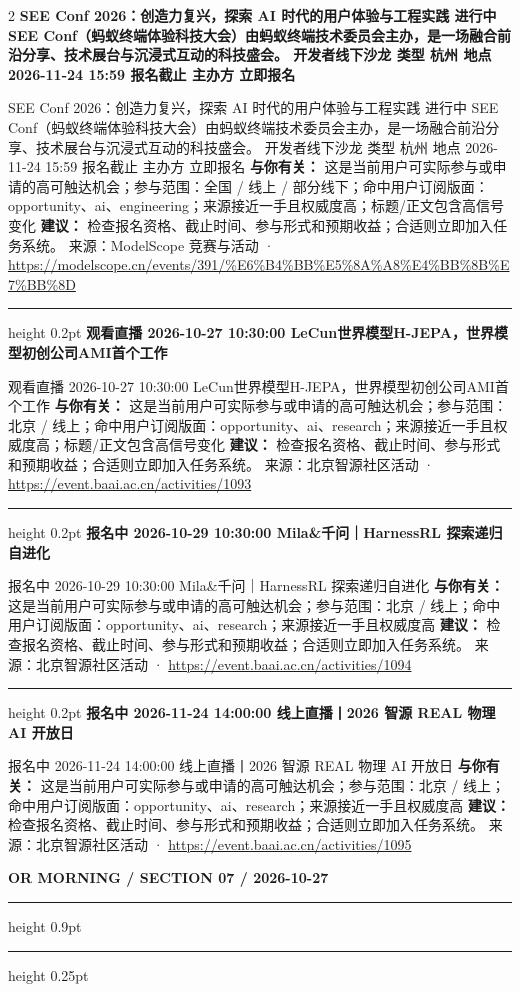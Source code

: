 \documentclass[10.5pt]{ctexart}
\begin{document}
\begin{multicols}{2}
{\large\bfseries SEE Conf 2026：创造力复兴，探索 AI 时代的用户体验与工程实践 进行中 SEE Conf（蚂蚁终端体验科技大会）由蚂蚁终端技术委员会主办，是一场融合前沿分享、技术展台与沉浸式互动的科技盛会。 开发者线下沙龙 类型 杭州 地点 2026-11-24 15:59 报名截止 主办方 立即报名}\par
SEE Conf 2026：创造力复兴，探索 AI 时代的用户体验与工程实践 进行中 SEE Conf（蚂蚁终端体验科技大会）由蚂蚁终端技术委员会主办，是一场融合前沿分享、技术展台与沉浸式互动的科技盛会。 开发者线下沙龙 类型 杭州 地点 2026-11-24 15:59 报名截止 主办方 立即报名
\textbf{与你有关：} 这是当前用户可实际参与或申请的高可触达机会；参与范围：全国 / 线上 / 部分线下；命中用户订阅版面：opportunity、ai、engineering；来源接近一手且权威度高；标题/正文包含高信号变化
\textbf{建议：} 检查报名资格、截止时间、参与形式和预期收益；合适则立即加入任务系统。
{\footnotesize\color{ormuted} 来源：ModelScope 竞赛与活动 · \url{https://modelscope.cn/events/391/%E6%B4%BB%E5%8A%A8%E4%BB%8B%E7%BB%8D}}
\vspace{2mm}
\hrule height 0.2pt
\vspace{2mm}
{\large\bfseries 观看直播 2026-10-27 10:30:00 LeCun世界模型H-JEPA，世界模型初创公司AMI首个工作}\par
观看直播 2026-10-27 10:30:00 LeCun世界模型H-JEPA，世界模型初创公司AMI首个工作
\textbf{与你有关：} 这是当前用户可实际参与或申请的高可触达机会；参与范围：北京 / 线上；命中用户订阅版面：opportunity、ai、research；来源接近一手且权威度高；标题/正文包含高信号变化
\textbf{建议：} 检查报名资格、截止时间、参与形式和预期收益；合适则立即加入任务系统。
{\footnotesize\color{ormuted} 来源：北京智源社区活动 · \url{https://event.baai.ac.cn/activities/1093}}
\vspace{2mm}
\hrule height 0.2pt
\vspace{2mm}
{\large\bfseries 报名中 2026-10-29 10:30:00 Mila\&千问｜HarnessRL 探索递归自进化}\par
报名中 2026-10-29 10:30:00 Mila\&千问｜HarnessRL 探索递归自进化
\textbf{与你有关：} 这是当前用户可实际参与或申请的高可触达机会；参与范围：北京 / 线上；命中用户订阅版面：opportunity、ai、research；来源接近一手且权威度高
\textbf{建议：} 检查报名资格、截止时间、参与形式和预期收益；合适则立即加入任务系统。
{\footnotesize\color{ormuted} 来源：北京智源社区活动 · \url{https://event.baai.ac.cn/activities/1094}}
\vspace{2mm}
\hrule height 0.2pt
\vspace{2mm}
{\large\bfseries 报名中 2026-11-24 14:00:00 线上直播丨2026 智源 REAL 物理 AI 开放日}\par
报名中 2026-11-24 14:00:00 线上直播丨2026 智源 REAL 物理 AI 开放日
\textbf{与你有关：} 这是当前用户可实际参与或申请的高可触达机会；参与范围：北京 / 线上；命中用户订阅版面：opportunity、ai、research；来源接近一手且权威度高
\textbf{建议：} 检查报名资格、截止时间、参与形式和预期收益；合适则立即加入任务系统。
{\footnotesize\color{ormuted} 来源：北京智源社区活动 · \url{https://event.baai.ac.cn/activities/1095}}
\end{multicols}
\newpage
{\small\bfseries OR MORNING / SECTION 07 / 2026-10-27}
\vspace{2mm}
\hrule height 0.9pt
\vspace{1.5mm}
\hrule height 0.25pt
\vspace{4mm}
\end{document}
